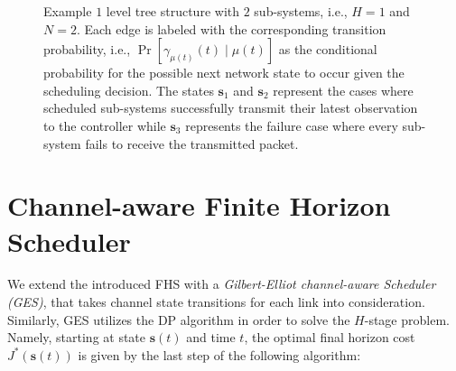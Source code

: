 \begin{figure}[htb]
	\centering
  \resizebox{.8\columnwidth}{!}{} 
  \caption[FHS: Example tree structure with 2 sub-systems and finite horizon
  1]{Example $1$ level tree structure with $2$ sub-systems, i.e., $H=1$ and
  $N=2$. Each edge is labeled with the corresponding transition probability,
  i.e., $\Pr{[\gamma_{\mu(t)}(t)\mid \mu(t)]}$ as the conditional probability
  for the possible next network state to occur given the scheduling decision.
  The states $\textbf{s}_1$ and $\textbf{s}_2$ represent the cases where
  scheduled sub-systems successfully transmit their latest observation to the
  controller while $\textbf{s}_3$ represents the failure case where every
  sub-system fails to receive the transmitted packet.}
	\label{fig:FHStree}
\end{figure}

\section{Channel-aware Finite Horizon Scheduler} \label{sec:gescheduler}

We extend the introduced FHS with a \textit{Gilbert-Elliot channel-aware
Scheduler (GES)}, that takes channel state transitions for each link into
consideration. Similarly, GES utilizes the DP algorithm in order to solve the
$H$-stage problem. Namely, starting at state $\boldsymbol{s}(t)$ and time $t$,
the optimal final horizon cost $J^*(\boldsymbol{s}(t))$ is given by the last
step of the following algorithm:


\begin{center}
\end{center}
  

